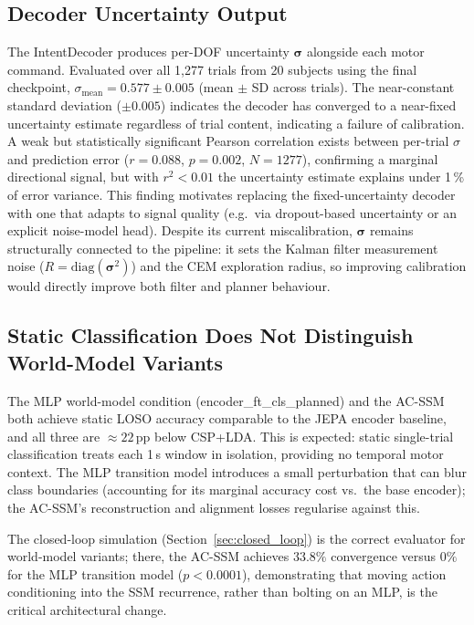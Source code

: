\documentclass[journal]{IEEEtran}
\begin{document}
\subsection{Decoder Uncertainty Output}
The IntentDecoder produces per-DOF uncertainty $\bm\sigma$ alongside each motor command.
Evaluated over all 1,277 trials from 20 subjects using the final checkpoint, $\sigma_\text{mean} = 0.577 \pm 0.005$ (mean $\pm$ SD across trials).
The near-constant standard deviation ($\pm 0.005$) indicates the decoder has converged to a near-fixed uncertainty estimate regardless of trial content, indicating a failure of calibration.
A weak but statistically significant Pearson correlation exists between per-trial $\sigma$ and prediction error ($r = 0.088$, $p = 0.002$, $N=1277$), confirming a marginal directional signal, but with $r^2 < 0.01$ the uncertainty estimate explains under 1\,\% of error variance.
This finding motivates replacing the fixed-uncertainty decoder with one that adapts to signal quality (e.g.\ via dropout-based uncertainty or an explicit noise-model head).
Despite its current miscalibration, $\bm\sigma$ remains structurally connected to the pipeline: it sets the Kalman filter measurement noise ($R = \text{diag}(\bm\sigma^2)$) and the CEM exploration radius, so improving calibration would directly improve both filter and planner behaviour.

\subsection{Static Classification Does Not Distinguish World-Model Variants}

The MLP world-model condition (encoder\_ft\_cls\_planned) and the AC-SSM both achieve static LOSO accuracy comparable to the JEPA encoder baseline, and all three are $\approx\!22$\,pp below CSP+LDA.
This is expected: static single-trial classification treats each 1\,s window in isolation, providing no temporal motor context.
The MLP transition model introduces a small perturbation that can blur class boundaries (accounting for its marginal accuracy cost vs.\ the base encoder); the AC-SSM's reconstruction and alignment losses regularise against this.

The closed-loop simulation (Section~\ref{sec:closed_loop}) is the correct evaluator for world-model variants; there, the AC-SSM achieves $33.8\%$ convergence versus $0\%$ for the MLP transition model ($p{<}0.0001$), demonstrating that moving action conditioning into the SSM recurrence, rather than bolting on an MLP, is the critical architectural change.
\end{document}
